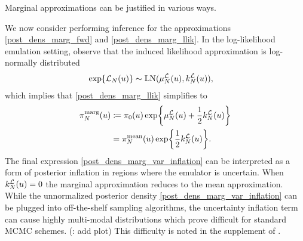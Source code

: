 \documentclass[12pt]{article}
\begin{document}
Marginal approximations can be justified in various ways. \todo

We now consider performing inference for the approximations \ref{post_dens_marg_fwd} and \ref{post_dens_marg_llik}. 
In the log-likelihood emulation setting, observe that the induced likelihood approximation is log-normally distributed
\begin{align}
\Exp{\llikEm[\Ndesign](\Par)} &\sim \LN(\emMean[\Ndesign]{\llik}(\Par), \emKer[\Ndesign]{\llik}(\Par)), 
\end{align}
which implies that \ref{post_dens_marg_llik} simplifies to 
\begin{align}
\llikEmMargDens[\Ndesign](\Par) 
&\Def \priorDens(\Par) \Exp{\emMean[\Ndesign]{\llik}(\Par) + \frac{1}{2} \emKer[\Ndesign]{\llik}(\Par)} 
\label{post_dens_marg_llik_simplified} \\
&= \llikEmMeanDens[\Ndesign](\Par) \Exp{\frac{1}{2} \emKer[\Ndesign]{\llik}(\Par)}. 
\label{post_dens_marg_var_inflation}
\end{align}
The final expression \ref{post_dens_marg_var_inflation} can be interpreted as a form of posterior inflation 
in regions where the emulator is uncertain. When $\emKer[\Ndesign]{\llik}(\Par) = 0$ the marginal approximation 
reduces to the mean approximation. While the unnormalized posterior density \ref{post_dens_marg_var_inflation}
can be plugged into off-the-shelf sampling algorithms, the uncertainty inflation term can cause highly multi-modal 
distributions which prove difficult for standard MCMC schemes. (\todo: add plot) This difficulty is noted in the 
supplement of \cite{VehtariParallelGP}. 
\end{document}
